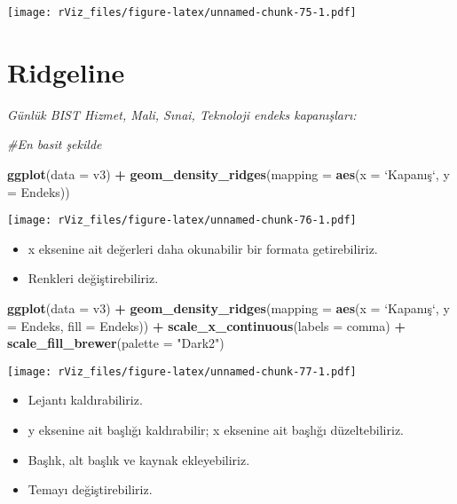 \documentclass[
]{book}
\newenvironment{Shaded}{\begin{snugshade}}{\end{snugshade}}
\newcommand{\CommentTok}[1]{\textcolor[rgb]{0.56,0.35,0.01}{\textit{#1}}}
\newcommand{\DataTypeTok}[1]{\textcolor[rgb]{0.13,0.29,0.53}{#1}}
\newcommand{\KeywordTok}[1]{\textcolor[rgb]{0.13,0.29,0.53}{\textbf{#1}}}
\newcommand{\NormalTok}[1]{#1}
\newcommand{\OperatorTok}[1]{\textcolor[rgb]{0.81,0.36,0.00}{\textbf{#1}}}
\newcommand{\StringTok}[1]{\textcolor[rgb]{0.31,0.60,0.02}{#1}}
\begin{document}
\texttt{[image: rViz\_files/figure-latex/unnamed-chunk-75-1.pdf]}

\hypertarget{ridgeline}{%
\section{Ridgeline}\label{ridgeline}}

\emph{Günlük BIST Hizmet, Mali, Sınai, Teknoloji endeks kapanışları:}

\begin{Shaded}
\begin{Highlighting}[]
\CommentTok{#En basit şekilde}

\KeywordTok{ggplot}\NormalTok{(}\DataTypeTok{data =}\NormalTok{ v3) }\OperatorTok{+}
\StringTok{  }\KeywordTok{geom_density_ridges}\NormalTok{(}\DataTypeTok{mapping =} \KeywordTok{aes}\NormalTok{(}\DataTypeTok{x =} \StringTok{`}\DataTypeTok{Kapanış}\StringTok{`}\NormalTok{, }\DataTypeTok{y =}\NormalTok{ Endeks))}
\end{Highlighting}
\end{Shaded}

\texttt{[image: rViz\_files/figure-latex/unnamed-chunk-76-1.pdf]}

\begin{itemize}
\item
  x eksenine ait değerleri daha okunabilir bir formata getirebiliriz.
\item
  Renkleri değiştirebiliriz.
\end{itemize}

\begin{Shaded}
\begin{Highlighting}[]
\KeywordTok{ggplot}\NormalTok{(}\DataTypeTok{data =}\NormalTok{ v3) }\OperatorTok{+}
\StringTok{  }\KeywordTok{geom_density_ridges}\NormalTok{(}\DataTypeTok{mapping =} \KeywordTok{aes}\NormalTok{(}\DataTypeTok{x =} \StringTok{`}\DataTypeTok{Kapanış}\StringTok{`}\NormalTok{, }\DataTypeTok{y =}\NormalTok{ Endeks, }\DataTypeTok{fill =}\NormalTok{ Endeks)) }\OperatorTok{+}
\StringTok{  }\KeywordTok{scale_x_continuous}\NormalTok{(}\DataTypeTok{labels =}\NormalTok{ comma) }\OperatorTok{+}
\StringTok{  }\KeywordTok{scale_fill_brewer}\NormalTok{(}\DataTypeTok{palette =} \StringTok{"Dark2"}\NormalTok{)}
\end{Highlighting}
\end{Shaded}

\texttt{[image: rViz\_files/figure-latex/unnamed-chunk-77-1.pdf]}

\begin{itemize}
\item
  Lejantı kaldırabiliriz.
\item
  y eksenine ait başlığı kaldırabilir; x eksenine ait başlığı düzeltebiliriz.
\item
  Başlık, alt başlık ve kaynak ekleyebiliriz.
\item
  Temayı değiştirebiliriz.
\end{itemize}
\end{document}

